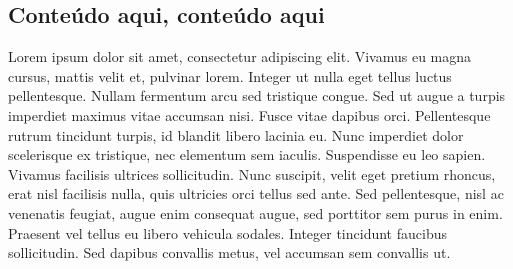 

\subsection{Conteúdo aqui, conteúdo aqui}

Lorem ipsum dolor sit amet, consectetur adipiscing elit. Vivamus eu magna cursus, mattis velit et, pulvinar lorem. Integer ut nulla eget tellus luctus pellentesque. Nullam fermentum arcu sed tristique congue. Sed ut augue a turpis imperdiet maximus vitae accumsan nisi. Fusce vitae dapibus orci. Pellentesque rutrum tincidunt turpis, id blandit libero lacinia eu. Nunc imperdiet dolor scelerisque ex tristique, nec elementum sem iaculis. Suspendisse eu leo sapien. Vivamus facilisis ultrices sollicitudin. Nunc suscipit, velit eget pretium rhoncus, erat nisl facilisis nulla, quis ultricies orci tellus sed ante. Sed pellentesque, nisl ac venenatis feugiat, augue enim consequat augue, sed porttitor sem purus in enim. Praesent vel tellus eu libero vehicula sodales. Integer tincidunt faucibus sollicitudin. Sed dapibus convallis metus, vel accumsan sem convallis ut.



